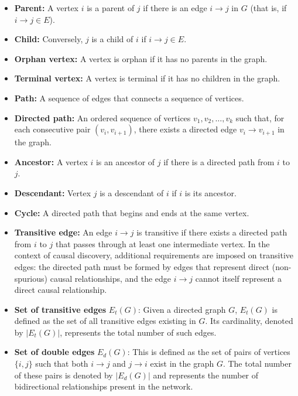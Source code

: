 \documentclass[12pt,a4paper]{report}
\begin{document}
\begin{itemize}
    \item \textbf{Parent:} A vertex \( i \) is a parent of \( j \) if there is an edge \( i \to j \) in $G$ (that is, if \( i \to j \in E \)).
    \item \textbf{Child:} Conversely, \( j \) is a child of \( i \) if \( i \to j \in E \).
    \item \textbf{Orphan vertex:} A vertex is orphan if it has no parents in the graph.
    \item \textbf{Terminal vertex:} A vertex is terminal if it has no children in the graph.
     \item \textbf{Path:} A sequence of edges that connects a sequence of vertices.
     \item \textbf{Directed path:} An ordered sequence of vertices \( v_1, v_2, \dots, v_k \) such that, for each consecutive pair \( (v_i, v_{i+1}) \), there exists a directed edge \( v_i \to v_{i+1} \) in the graph.
    \item \textbf{Ancestor:} A vertex \( i \) is an ancestor of \( j \) if there is a directed path from \( i \) to \( j \).
    \item \textbf{Descendant:} Vertex \( j \) is a descendant of \( i \) if \( i \) is its ancestor.
    \item \textbf{Cycle:} A directed path that begins and ends at the same vertex.
    \item \textbf{Transitive edge:} An edge \(i \to j \) is transitive if there exists a directed path from \( i \) to \( j \) that passes through at least one intermediate vertex. In the context of causal discovery, additional requirements are imposed on transitive edges: the directed path must be formed by edges that represent direct (non-spurious) causal relationships, and the edge \(i \to j \) cannot itself represent a direct causal relationship.
    \item \textbf{Set of transitive edges} \( E_t(G) \): Given a directed graph \( G \), \( E_t(G) \) is defined as the set of all transitive edges existing in \( G \). Its cardinality, denoted by \( |E_t(G)| \), represents the total number of such edges.
    \item \textbf{Set of double edges} \( E_d(G) \): This is defined as the set of pairs of vertices \( \{i, j\} \) such that both \( i \to j \) and \( j \to i \) exist in the graph \( G \). The total number of these pairs is denoted by \( |E_d(G)| \) and represents the number of bidirectional relationships present in the network. 
\end{itemize}
\end{document}
